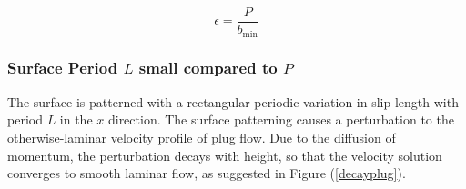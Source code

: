 \documentclass[12pt, a4paper, twoside, openright]{book}
\newcommand{\bmin}{\ensuremath{b_{\mathrm{min}}}}
\begin{document}
\begin{equation}
\epsilon = \frac{P}{\bmin}
\end{equation}

\clearpage

\subsubsection*{Surface Period $L$ small compared to $P$}

The surface is patterned with a rectangular-periodic variation in slip length with period $L$ in the $x$ direction. The surface patterning causes a perturbation to the otherwise-laminar velocity profile of plug flow.  Due to the diffusion of momentum, the perturbation decays with height, so that the velocity solution converges to smooth laminar flow, as suggested in Figure (\ref{decayplug}).
\end{document}
